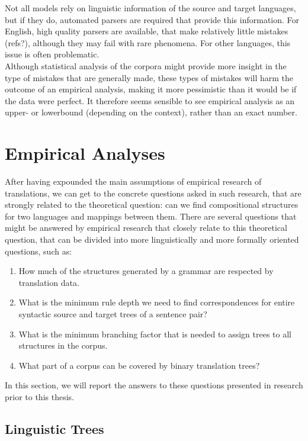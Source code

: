 \documentclass{report}
\theoremstyle{break}
\begin{document}
Not all models rely on linguistic information of the source and target languages, but if they do, automated parsers are required that provide this information. For English, high quality parsers are available, that make relatively little mistakes (refs?), although they may fail with rare phenomena. For other languages, this issue is often problematic.\\

Although statistical analysis of the corpora might provide more insight in the type of mistakes that are generally made, these types of mistakes will harm the outcome of an empirical analysis, making it more pessimistic than it would be if the data were perfect. It therefore seems sensible to see empirical analysis as an upper- or lowerbound (depending on the context), rather than an exact number.


\section{Empirical Analyses}

After having expounded the main assumptions of empirical research of translations, we can get to the concrete questions asked in such research, that are strongly related to the theoretical question: can we find compositional structures for two languages and mappings between them. There are several questions that might be answered by empirical research that closely relate to this theoretical question, that can be divided into more linguistically and more formally oriented questions, such as:

\begin{enumerate}
\item How much of the structures generated by a grammar are respected by translation data.
\item What is the minimum rule depth we need to find correspondences for entire syntactic source and target trees of a sentence pair?
\item What is the minimum branching factor that is needed to assign trees to all structures in the corpus.
\item What part of a corpus can be covered by binary translation trees?
\end{enumerate}

In this section, we will report the answers to these questions presented in research prior to this thesis.

\subsection{Linguistic Trees}
\end{document}
